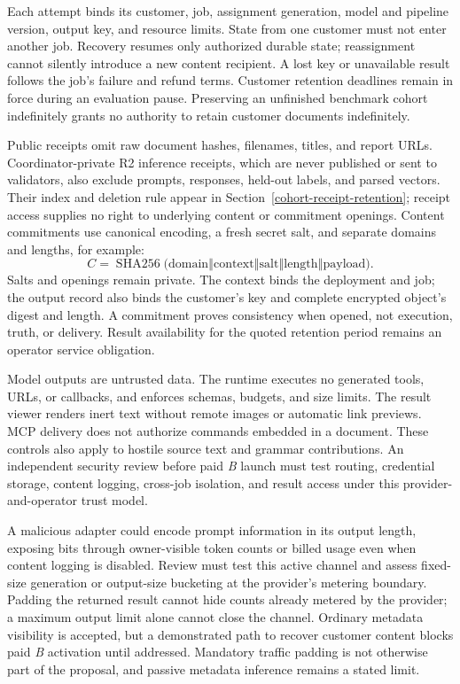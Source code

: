 Each attempt binds its customer, job, assignment generation, model and pipeline
version, output key, and resource limits. State from one customer must not enter
another job. Recovery resumes only authorized durable state; reassignment
cannot silently introduce a new content recipient. A lost key or unavailable
result follows the job's failure and refund terms. Customer retention deadlines
remain in force during an evaluation pause. Preserving an unfinished benchmark
cohort indefinitely grants no authority to retain customer documents indefinitely.

Public receipts omit raw document hashes, filenames, titles, and report URLs.
Coordinator-private R2 inference receipts, which are never published or sent
to validators, also exclude prompts, responses, held-out labels, and parsed
vectors. Their index and deletion rule appear in
Section~\ref{cohort-receipt-retention};
receipt access supplies no right to underlying content or commitment openings.
Content commitments use canonical encoding, a fresh secret salt, and separate
domains and lengths, for example:
\begin{equation}\label{eq:input-commitment}
C=\operatorname{SHA256}\bigl(
\mathrm{domain}\mathbin\Vert\mathrm{context}\mathbin\Vert
\mathrm{salt}\mathbin\Vert\mathrm{length}\mathbin\Vert
\mathrm{payload}\bigr).
\end{equation}
Salts and openings remain private. The context binds the deployment and job;
the output record also binds the customer's key and complete encrypted object's
digest and length. A commitment proves consistency when opened, not execution,
truth, or delivery. Result availability for the quoted retention period remains
an operator service obligation.

Model outputs are untrusted data. The runtime executes no generated tools,
URLs, or callbacks, and enforces schemas, budgets, and size limits. The result
viewer renders inert text without remote images or automatic link previews.
MCP delivery does not authorize commands embedded in a document. These controls
also apply to hostile source text and grammar contributions. An independent
security review before paid \textit{B} launch must test routing, credential
storage, content logging, cross-job isolation, and result access under this
provider-and-operator trust model.

A malicious adapter could encode prompt information in its output length,
exposing bits through owner-visible token counts or billed usage even when
content logging is disabled. Review must test this active channel and assess
fixed-size generation or output-size bucketing at the provider's metering
boundary. Padding the returned result cannot hide counts already metered by
the provider; a maximum output limit alone cannot close the channel. Ordinary
metadata visibility is accepted, but a demonstrated path to recover customer
content blocks paid \textit{B} activation until addressed. Mandatory traffic
padding is not otherwise part of the proposal, and passive metadata inference
remains a stated limit.


